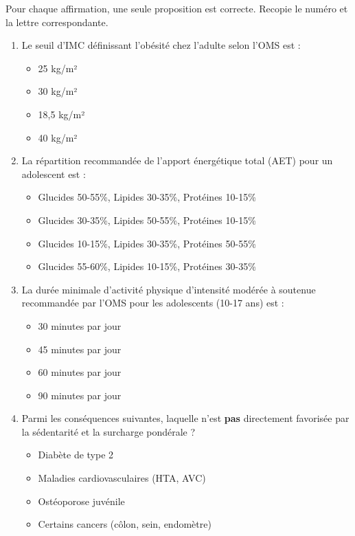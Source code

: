 \documentclass[11pt]{article}
\begin{document}
\begin{exercice}
Pour chaque affirmation, une seule proposition est correcte. Recopie le numéro et la lettre correspondante.
\begin{enumerate}
\item Le seuil d'IMC définissant l'obésité chez l'adulte selon l'OMS est :
\begin{itemize}
\item[A.] 25 kg/m²
\item[B.] 30 kg/m²
\item[C.] 18,5 kg/m²
\item[D.] 40 kg/m²
\end{itemize}
\item La répartition recommandée de l'apport énergétique total (AET) pour un adolescent est :
\begin{itemize}
\item[A.] Glucides 50-55\%, Lipides 30-35\%, Protéines 10-15\%
\item[B.] Glucides 30-35\%, Lipides 50-55\%, Protéines 10-15\%
\item[C.] Glucides 10-15\%, Lipides 30-35\%, Protéines 50-55\%
\item[D.] Glucides 55-60\%, Lipides 10-15\%, Protéines 30-35\%
\end{itemize}
\item La durée minimale d'activité physique d'intensité modérée à soutenue recommandée par l'OMS pour les adolescents (10-17 ans) est :
\begin{itemize}
\item[A.] 30 minutes par jour
\item[B.] 45 minutes par jour
\item[C.] 60 minutes par jour
\item[D.] 90 minutes par jour
\end{itemize}
\item Parmi les conséquences suivantes, laquelle n'est \textbf{pas} directement favorisée par la sédentarité et la surcharge pondérale ?
\begin{itemize}
\item[A.] Diabète de type 2
\item[B.] Maladies cardiovasculaires (HTA, AVC)
\item[C.] Ostéoporose juvénile
\item[D.] Certains cancers (côlon, sein, endomètre)
\end{itemize}
\end{enumerate}
\end{exercice}
\end{document}

